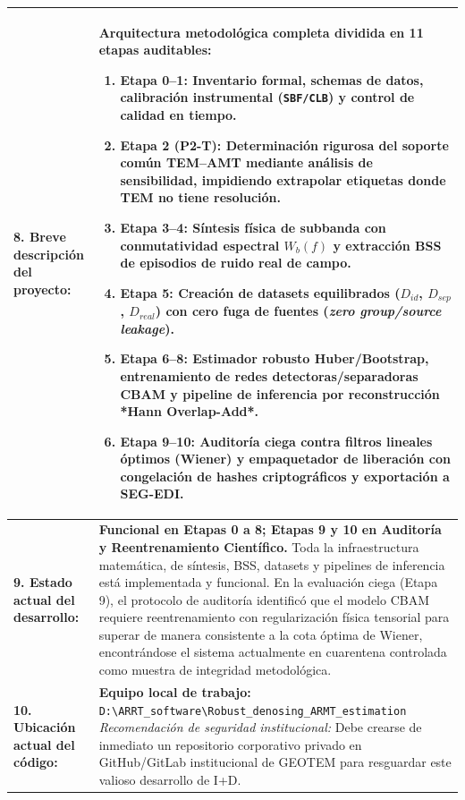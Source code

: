 \documentclass[11pt,letterpaper]{article}
\begin{document}
\begin{tcolorbox}
\begin{tabularx}{\textwidth}{@{} p{4.6cm} X @{}}
    \textbf{8. Breve descripción del proyecto:} & 
    Arquitectura metodológica completa dividida en 11 etapas auditables:
    \begin{enumerate}[leftmargin=1.2em, topsep=2pt, itemsep=1pt]
        \item \textbf{Etapa 0--1:} Inventario formal, schemas de datos, calibración instrumental (\texttt{SBF/CLB}) y control de calidad en tiempo.
        \item \textbf{Etapa 2 (P2-T):} Determinación rigurosa del soporte común TEM--AMT mediante análisis de sensibilidad, impidiendo extrapolar etiquetas donde TEM no tiene resolución.
        \item \textbf{Etapa 3--4:} Síntesis física de subbanda con conmutatividad espectral $W_b(f)$ y extracción BSS de episodios de ruido real de campo.
        \item \textbf{Etapa 5:} Creación de datasets equilibrados ($D_{id}$, $D_{sep}$, $D_{real}$) con cero fuga de fuentes (\textit{zero group/source leakage}).
        \item \textbf{Etapa 6--8:} Estimador robusto Huber/Bootstrap, entrenamiento de redes detectoras/separadoras CBAM y pipeline de inferencia por reconstrucción *Hann Overlap-Add*.
        \item \textbf{Etapa 9--10:} Auditoría ciega contra filtros lineales óptimos (Wiener) y empaquetador de liberación con congelación de hashes criptográficos y exportación a \textbf{SEG-EDI}.
    \end{enumerate} \\
    \hline

    \textbf{9. Estado actual del desarrollo:} & 
    \textbf{Funcional en Etapas 0 a 8; Etapas 9 y 10 en Auditoría y Reentrenamiento Científico.} \newline
    Toda la infraestructura matemática, de síntesis, BSS, datasets y pipelines de inferencia está implementada y funcional. En la evaluación ciega (Etapa 9), el protocolo de auditoría identificó que el modelo CBAM requiere reentrenamiento con regularización física tensorial para superar de manera consistente a la cota óptima de Wiener, encontrándose el sistema actualmente en cuarentena controlada como muestra de integridad metodológica. \\
    \hline

    \textbf{10. Ubicación actual del código:} & 
    \textbf{Equipo local de trabajo:} \texttt{D:\textbackslash ARRT\_software\textbackslash Robust\_denosing\_ARMT\_estimation} \newline
    \textit{Recomendación de seguridad institucional:} Debe crearse de inmediato un repositorio corporativo privado en GitHub/GitLab institucional de GEOTEM para resguardar este valioso desarrollo de I+D. \\
\end{tabularx}
\end{tcolorbox}
\end{document}
